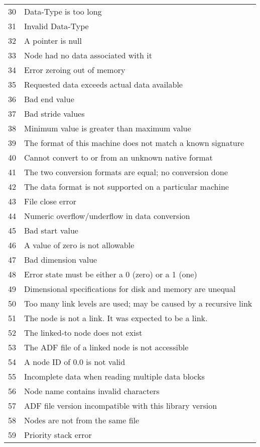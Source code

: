 \begin{longtable}{c >{\raggedright\arraybackslash}p{\Pwidth}}
30  & Data-Type is too long \\
31  & Invalid Data-Type \\
32  & A pointer is null \\
33  & Node had no data associated with it \\
34  & Error zeroing out of memory \\
35  & Requested data exceeds actual data available \\
36  & Bad end value \\
37  & Bad stride values \\
38  & Minimum value is greater than maximum value \\
39  & The format of this machine does not match a known signature \\
40  & Cannot convert to or from an unknown native format \\
41  & The two conversion formats are equal; no conversion done \\
42  & The data format is not supported on a particular machine \\
43  & File close error \\
44  & Numeric overflow/underflow in data conversion \\
45  & Bad start value \\
46  & A value of zero is not allowable \\
47  & Bad dimension value \\
48  & Error state must be either a 0 (zero) or a 1 (one) \\
49  & Dimensional specifications for disk and memory are unequal \\
50  & Too many link levels are used; may be caused by a recursive link \\
51  & The node is not a link. It was expected to be a link. \\
52  & The linked-to node does not exist \\
53  & The ADF file of a linked node is not accessible \\
54  & A node ID of 0.0 is not valid \\
55  & Incomplete data when reading multiple data blocks \\
56  & Node name contains invalid characters \\
57  & ADF file version incompatible with this library version \\
58  & Nodes are not from the same file \\
59  & Priority stack error \\

\end{longtable}
